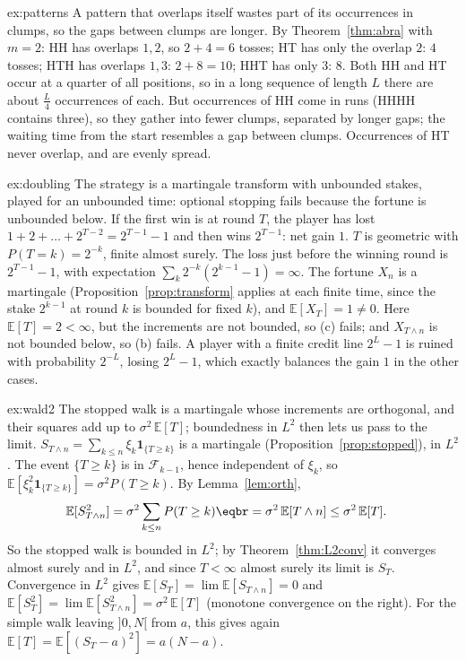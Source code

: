 \begin{solution}{ex:patterns}
\idea A pattern that overlaps itself wastes part of its occurrences in clumps, so the gaps between clumps are longer.
\writeup By Theorem~\ref{thm:abra} with $m=2$: HH has overlaps $1,2$, so $2+4=6$ tosses; HT has only the overlap $2$: $4$ tosses; HTH has overlaps $1,3$:
$2+8=10$; HHT has only $3$: $8$. Both HH and HT occur at a quarter of all positions, so in a long sequence of length $L$ there are about
$\frac L4$ occurrences of each. But occurrences of HH come in runs (HHHH contains three), so they gather into fewer clumps,
separated by longer gaps; the waiting time from the start resembles a gap between clumps. Occurrences of HT never
overlap, and are evenly spread.
\end{solution}

\begin{solution}{ex:doubling}
\idea The strategy is a martingale transform with unbounded stakes, played for an unbounded time: optional stopping fails
because the fortune is unbounded below.
\writeup If the first win is at round $T$, the player has lost $1+2+\dots+2^{T-2}=2^{T-1}-1$ and then wins $2^{T-1}$: net gain $1$. $T$ is geometric with
$P(T=k)=2^{-k}$, finite almost surely. The loss just before the winning round is $2^{T-1}-1$, with expectation $\sum_k2^{-k}(2^{k-1}-1)=\infty$. The fortune
$X_n$ is a martingale (Proposition~\ref{prop:transform} applies at each finite time, since the stake $2^{k-1}$ at round $k$ is bounded for fixed $k$), and $\mathbb E[X_T]=1\ne0$.
Here $\mathbb E[T]=2<\infty$, but the increments are not bounded, so (c) fails; and $X_{T\wedge n}$ is not bounded below, so (b) fails. A player with a finite
credit line $2^L-1$ is ruined with probability $2^{-L}$, losing $2^L-1$, which exactly balances the gain $1$ in the other cases.
\end{solution}

\begin{solution}{ex:wald2}
\idea The stopped walk is a martingale whose increments are orthogonal, and their squares add up to $\sigma^2\,\mathbb E[T]$; boundedness in $L^2$
then lets us pass to the limit.
\writeup $S_{T\wedge n}=\sum_{k\le n}\xi_k\mathbf 1_{\{T\ge k\}}$ is a martingale (Proposition~\ref{prop:stopped}), in $L^2$. The event $\{T\ge k\}$ is in $\mathcal F_{k-1}$, hence independent of $\xi_k$,
so $\mathbb E[\xi_k^2\mathbf 1_{\{T\ge k\}}]=\sigma^2P(T\ge k)$. By Lemma~\ref{lem:orth},
\[
\begin{aligned}\mathbb E[S_{T\wedge n}^2]&=\sigma^2\sum_{k\le n}P(T\ge k)\eqbr=\sigma^2\,\mathbb E[T\wedge n]\le\sigma^2\,\mathbb E[T].\end{aligned}
\]
So the stopped walk is bounded in $L^2$; by Theorem~\ref{thm:L2conv} it converges almost surely and in $L^2$, and since $T<\infty$ almost surely its limit is
$S_T$. Convergence in $L^2$ gives $\mathbb E[S_T]=\lim\mathbb E[S_{T\wedge n}]=0$ and $\mathbb E[S_T^2]=\lim\mathbb E[S_{T\wedge n}^2]=\sigma^2\,\mathbb E[T]$ (monotone convergence on the right). For the simple walk
leaving $]0,N[$ from $a$, this gives again $\mathbb E[T]=\mathbb E[(S_T-a)^2]=a(N-a)$.
\end{solution}

